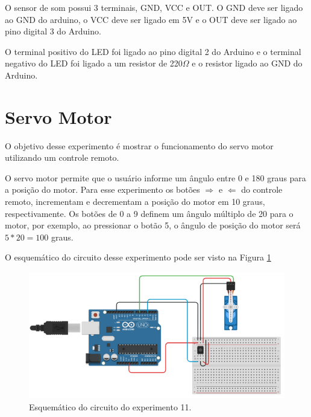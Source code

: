 \documentclass[12pt]{article}
\begin{document}
O sensor de som possui 3 terminais, GND, VCC e OUT. O GND deve ser ligado ao GND do arduino, o VCC deve ser ligado em 5V e o OUT deve ser ligado ao pino digital 3 do Arduino.

O terminal positivo do LED foi ligado ao pino digital 2 do Arduino e o terminal negativo do LED foi ligado a um resistor de 220$\Omega$ e o resistor ligado ao GND do Arduino.

\section{Servo Motor}
O objetivo desse experimento é mostrar o funcionamento do servo motor utilizando um controle remoto.

O servo motor permite que o usuário informe um ângulo entre 0 e 180 graus para a posição do motor. Para esse experimento os botões $\Rightarrow$ e $\Leftarrow$ do controle remoto, incrementam e decrementam a posição do motor em 10 graus, respectivamente. Os botões de 0 a 9 definem um ângulo múltiplo de 20 para o motor, por exemplo, ao pressionar o botão 5, o ângulo de posição do motor será $5*20 = 100$ graus.

O esquemático do circuito desse experimento pode ser visto na Figura \ref{figExp11esq}

\begin{figure}[H]
	\centering
	\includegraphics[scale=0.5]{Imagens/Experimentos/11-ServoMotor/esq.png}
	\caption{Esquemático do circuito do experimento 11.}
	\label{figExp11esq}
\end{figure}



\end{document}
